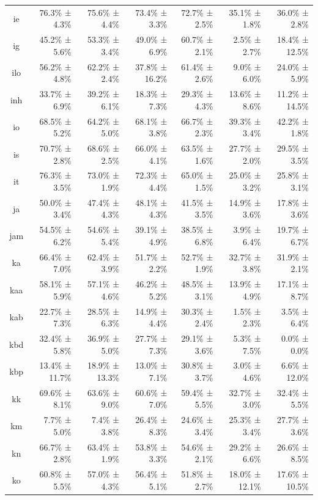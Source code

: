 \documentclass[10pt, a4paper]{article}
\begin{document}
\begin{table}[h]
\begin{tabular}{crrrrrr}
ie & 76.3\% ± 4.3\% & 75.6\% ± 4.4\% & 73.4\% ± 3.3\% & 72.7\% ± 2.5\% & 35.1\% ± 1.8\% & 36.0\% ± 2.8\% \\
ig & 45.2\% ± 5.6\% & 53.3\% ± 3.4\% & 49.0\% ± 6.9\% & 60.7\% ± 2.1\% & 2.5\% ± 2.7\% & 18.4\% ± 12.5\% \\
ilo & 56.2\% ± 4.8\% & 62.2\% ± 2.4\% & 37.8\% ± 16.2\% & 61.4\% ± 2.6\% & 9.0\% ± 6.0\% & 24.0\% ± 5.9\% \\
inh & 33.7\% ± 6.9\% & 39.2\% ± 6.1\% & 18.3\% ± 7.3\% & 29.3\% ± 4.3\% & 13.6\% ± 8.6\% & 11.2\% ± 14.5\% \\
io & 68.5\% ± 5.2\% & 64.2\% ± 5.0\% & 68.1\% ± 3.8\% & 66.7\% ± 2.3\% & 39.3\% ± 3.4\% & 42.2\% ± 1.8\% \\
is & 70.7\% ± 2.8\% & 68.6\% ± 2.5\% & 66.0\% ± 4.1\% & 63.5\% ± 1.6\% & 27.7\% ± 2.0\% & 29.5\% ± 3.5\% \\
it & 76.3\% ± 3.5\% & 73.0\% ± 1.9\% & 72.3\% ± 4.4\% & 65.0\% ± 1.5\% & 25.0\% ± 3.2\% & 25.8\% ± 3.1\% \\
ja & 50.0\% ± 3.4\% & 47.4\% ± 4.3\% & 48.1\% ± 4.3\% & 41.5\% ± 3.5\% & 14.9\% ± 3.6\% & 17.8\% ± 3.6\% \\
jam & 54.5\% ± 6.2\% & 54.6\% ± 5.4\% & 39.1\% ± 4.9\% & 38.5\% ± 6.8\% & 3.9\% ± 6.4\% & 19.7\% ± 6.7\% \\
ka & 66.4\% ± 7.0\% & 62.4\% ± 3.9\% & 51.7\% ± 2.2\% & 52.7\% ± 1.9\% & 32.7\% ± 3.8\% & 31.9\% ± 2.1\% \\
kaa & 58.1\% ± 5.9\% & 57.1\% ± 4.6\% & 46.2\% ± 5.2\% & 48.5\% ± 3.1\% & 13.9\% ± 4.9\% & 17.1\% ± 8.7\% \\
kab & 22.7\% ± 7.3\% & 28.5\% ± 6.3\% & 14.9\% ± 4.4\% & 30.3\% ± 2.4\% & 1.5\% ± 2.3\% & 3.5\% ± 6.4\% \\
kbd & 32.4\% ± 5.8\% & 36.9\% ± 5.0\% & 27.7\% ± 7.3\% & 29.1\% ± 3.6\% & 5.3\% ± 7.5\% & 0.0\% ± 0.0\% \\
kbp & 13.4\% ± 11.7\% & 18.9\% ± 13.3\% & 13.0\% ± 7.1\% & 30.8\% ± 3.7\% & 3.0\% ± 4.6\% & 6.6\% ± 12.0\% \\
kk & 69.6\% ± 8.1\% & 63.6\% ± 9.0\% & 60.6\% ± 7.0\% & 59.4\% ± 5.5\% & 32.7\% ± 3.0\% & 32.4\% ± 5.5\% \\
km & 7.7\% ± 5.0\% & 7.4\% ± 3.8\% & 26.4\% ± 8.3\% & 24.6\% ± 3.4\% & 25.3\% ± 3.4\% & 27.7\% ± 3.6\% \\
kn & 66.7\% ± 2.8\% & 63.4\% ± 1.9\% & 53.8\% ± 3.3\% & 54.6\% ± 2.1\% & 29.2\% ± 6.6\% & 26.6\% ± 8.5\% \\
ko & 60.8\% ± 5.5\% & 57.0\% ± 4.3\% & 56.4\% ± 5.1\% & 51.8\% ± 2.7\% & 18.0\% ± 12.1\% & 17.6\% ± 10.5\% \\

\end{tabular}
\end{table}
\end{document}
